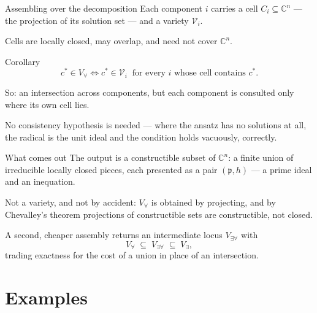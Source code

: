 \documentclass[10pt,aspectratio=169]{beamer}
\newcommand{\C}{\mathbb{C}}
\newcommand{\cstar}{c^{*}}
\begin{document}
\begin{frame}{Assembling over the decomposition}
Each component $i$ carries a \alert{cell} $C_{i} \subseteq \C^{n}$ --- the
projection of its solution set --- and a variety $\mathcal{V}_{i}$.

\pause
\medskip
Cells are locally closed, may \alert{overlap}, and need not cover $\C^{n}$.

\pause
\begin{block}{Corollary}
\[
  \cstar \in V_{\forall}
  \iff
  \cstar \in \mathcal{V}_{i} \ \text{ for every $i$ whose cell contains } \cstar .
\]
\end{block}

\pause
\medskip
So: an \alert{intersection} across components, but each component is consulted
only where its own cell lies.

\medskip
No consistency hypothesis is needed --- where the ansatz has no solutions at all,
the radical is the unit ideal and the condition holds vacuously, correctly.
\end{frame}

\begin{frame}{What comes out}
The output is a \alert{constructible} subset of $\C^{n}$: a finite union of
irreducible locally closed pieces, each presented as a pair
$(\mathfrak{p}, h)$ --- a prime ideal and an inequation.

\pause
\medskip
Not a variety, and not by accident: $V_{\forall}$ is obtained by projecting, and
by Chevalley's theorem projections of constructible sets are constructible, not
closed.

\pause
\medskip
A second, cheaper assembly returns an intermediate locus $V_{\exists\forall}$ with
\[
  V_{\forall} \;\subseteq\; V_{\exists\forall} \;\subseteq\; V_{\exists},
\]
trading exactness for the cost of a union in place of an intersection.
\end{frame}


\section{Examples}
\end{document}
